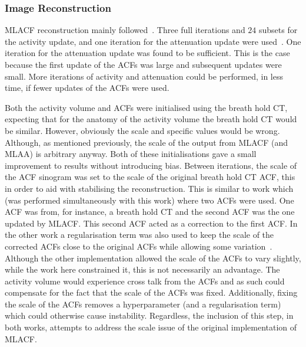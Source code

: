            \subsubsection{Image Reconstruction} \label{sec:evaluation_of_pet_ct_motion_correction_incorporating_motion_models_using_mlacf_and_complex_gating_schemes_methods_image_reconstruction}
                \gls{MLACF} reconstruction mainly followed~. Three full iterations and $24$ subsets for the activity update, and one iteration for the attenuation update were used~\parencite{Nuyts2012ML-reconstructionFactors}. One iteration for the attenuation update was found to be sufficient. This is the case because the first update of the \glspl{ACF} was large and subsequent updates were small. More iterations of activity and attenuation could be performed, in less time, if fewer updates of the \glspl{ACF} were used.
                
                Both the activity volume and \glspl{ACF} were initialised using the breath hold \gls{CT}, expecting that for the anatomy of the activity volume the breath hold \gls{CT} would be similar. However, obviously the scale and specific values would be wrong. Although, as mentioned previously, the scale of the output from \gls{MLACF} (and \gls{MLAA}) is arbitrary anyway. Both of these initialisations gave a small improvement to results without introducing bias. Between iterations, the scale of the \gls{ACF} sinogram was set to the scale of the original breath hold \gls{CT} \gls{ACF}, this in order to aid with stabilising the reconstruction. This is similar to work which (was performed simultaneously with this work) where two \glspl{ACF} were used. One \gls{ACF} was from, for instance, a  breath hold \gls{CT} and the second \gls{ACF} was the one updated by \gls{MLACF}. This second \gls{ACF} acted as a correction to the first \gls{ACF}. In the other work a regularisation term was also used to keep the scale of the corrected \glspl{ACF} close to the original \glspl{ACF} while allowing some variation~\parencite{Jolivet2022JointPET}. Although the other implementation allowed the scale of the \glspl{ACF} to vary slightly, while the work here constrained it, this is not necessarily an advantage. The activity volume would experience cross talk from the \glspl{ACF} and as such could compensate for the fact that the scale of the \glspl{ACF} was fixed. Additionally, fixing the scale of the \glspl{ACF} removes a hyperparameter (and a regularisation term) which could otherwise cause instability. Regardless, the inclusion of this step, in both works, attempts to address the scale issue of the original implementation of \gls{MLACF}.
                
